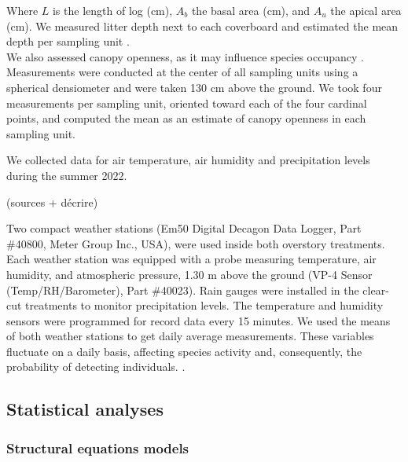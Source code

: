 Where $L$ is the length of log (cm), $A_b$ the basal area (cm), and $A_u$ the apical area (cm).
We measured litter depth next to each coverboard and estimated the mean depth per sampling unit \citep{Mazerolle2021Woodlandsalamander}. \\
We also assessed canopy openness, as it may influence species occupancy \citep{henneronForestPlantCommunity2017,koivulaBorealCarabidbeetleColeoptera2002a,kotzeFortyYearsCarabid2011a,messereForestFloorDistribution1998,tilghmanMetaanalysisEffectsCanopy2012}.
Measurements were conducted at the center of all sampling units using a spherical densiometer \citep{lemmonSphericalDensiometerEstimating1956} and were taken 130 cm above the ground. 
We took four measurements per sampling unit, oriented toward each of the four cardinal points, and computed the mean as an estimate of canopy openness in each sampling unit.

We collected data for air temperature, air humidity and precipitation levels during the summer 2022.

(sources + décrire)

Two compact weather stations (Em50 Digital Decagon Data Logger, Part \#40800, Meter Group Inc., USA), were used inside both overstory treatments.
Each weather station was equipped with a probe measuring temperature, air humidity, and atmospheric pressure, 1.30 m above the ground (VP-4 Sensor (Temp/RH/Barometer), Part \#40023). 
Rain gauges were installed in the clear-cut treatments to monitor precipitation levels.
The temperature and humidity sensors were programmed for record data every 15 minutes. 
We used the means of both weather stations to get daily average measurements.
These variables fluctuate on a daily basis, affecting species activity and, consequently, the probability of detecting individuals. 
\citep{butterfieldCarabidLifeCycle1996,kotzeFortyYearsCarabid2011a,loveiEcologyBehaviorGround1996,odonnellPredictingVariationMicrohabitat2014a,spotilaRoleTemperatureWater1972}.

\subsection*{Statistical analyses}
\label{subsec:analyses}

\subsubsection{Structural equations models} 

